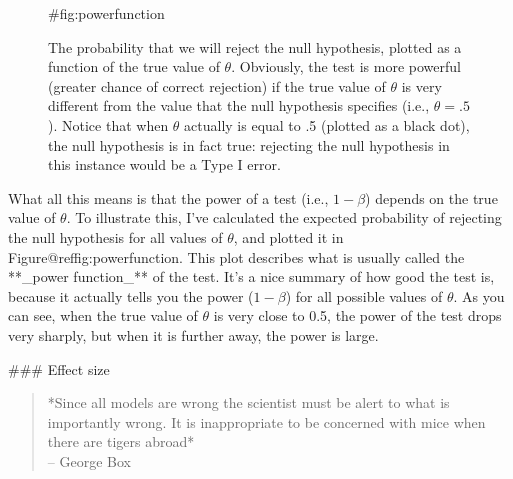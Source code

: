 \begin{figure}[t]
\begin{center}
\caption{The probability that we will reject the null hypothesis, plotted as a function of the true value of $\theta$. Obviously, the test is more powerful (greater chance of correct rejection) if the true value of $\theta$ is very different from the value that the null hypothesis specifies (i.e., $\theta=.5$). Notice that when $\theta$ actually is equal to .5 (plotted as a black dot), the null hypothesis is in fact true: rejecting the null hypothesis in this instance would be a Type I error.}
{#fig:powerfunction}
\HR
\end{center}
\end{figure}

What all this means is that the power of a test (i.e., $1-\beta$) depends on the true value of $\theta$. To illustrate this, I've calculated the expected probability of rejecting the null hypothesis for all values of $\theta$, and plotted it in Figure@reffig:powerfunction. This plot describes what is usually called the **_power function_** of the test. It's a nice summary of how good the test is, because it actually tells you the power ($1-\beta$) for all possible values of $\theta$. As you can see, when the true value of $\theta$ is very close to 0.5, the power of the test drops very sharply, but when it is further away, the power is large. 


### Effect size

\begin{quote}
*Since all models are wrong the scientist must be alert to what is importantly wrong. It is inappropriate to be concerned with mice when there are tigers abroad* \\
\hspace*{2cm} -- George Box \citeyear[p.~792]{Box1976}
\end{quote}

